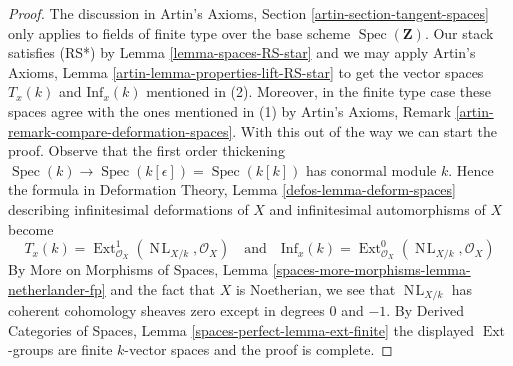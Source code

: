 \documentclass{stacks-project}
\theoremstyle{plain}
\theoremstyle{definition}
\theoremstyle{remark}
\numberwithin{equation}{subsection}
\def\Spec{\mathop{\mathrm{Spec}}}
\def\Ext{\mathop{\mathrm{Ext}}\nolimits}
\def\NL{\mathop{N\!L}\nolimits}
\begin{document}
\begin{proof}
The discussion in Artin's Axioms, Section \ref{artin-section-tangent-spaces}
only applies to fields of finite type over the base scheme $\Spec(\mathbf{Z})$.
Our stack satisfies (RS*) by Lemma \ref{lemma-spaces-RS-star}
and we may apply
Artin's Axioms, Lemma \ref{artin-lemma-properties-lift-RS-star}
to get the vector spaces $T_x(k)$ and $\text{Inf}_x(k)$
mentioned in (2). Moreover, in the finite type case these spaces agree with the
ones mentioned in (1)
by Artin's Axioms, Remark \ref{artin-remark-compare-deformation-spaces}.
With this out of the way we can start the proof.
Observe that the first order thickening
$\Spec(k) \to \Spec(k[\epsilon]) = \Spec(k[k])$
has conormal module $k$. Hence the formula in
Deformation Theory, Lemma \ref{defos-lemma-deform-spaces}
describing infinitesimal deformations of $X$ and infinitesimal
automorphisms of $X$ become
$$
T_x(k) = \Ext^1_{\mathcal{O}_X}(\NL_{X/k}, \mathcal{O}_X)
\quad\text{and}\quad
\text{Inf}_x(k) = \Ext^0_{\mathcal{O}_X}(\NL_{X/k}, \mathcal{O}_X)
$$
By More on Morphisms of Spaces, Lemma
\ref{spaces-more-morphisms-lemma-netherlander-fp}
and the fact that $X$ is Noetherian, we see that
$\NL_{X/k}$ has coherent cohomology sheaves zero except
in degrees $0$ and $-1$.
By Derived Categories of Spaces, Lemma \ref{spaces-perfect-lemma-ext-finite}
the displayed $\Ext$-groups are finite $k$-vector spaces
and the proof is complete.
\end{proof}
\end{document}
